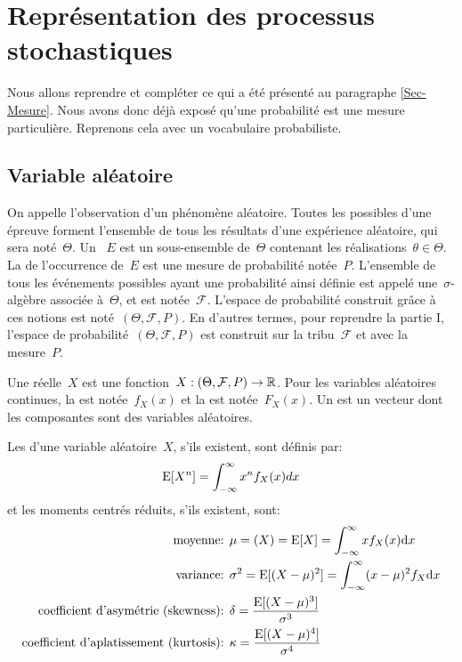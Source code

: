 \medskip
\section{Représentation des processus stochastiques}

Nous allons reprendre et compléter ce qui a été présenté au paragraphe \ref{Sec-Mesure}.
Nous avons donc déjà exposé qu'une probabilité est une mesure particulière.
Reprenons cela avec un vocabulaire probabiliste.

\medskip
\subsection{Variable aléatoire}

On appelle  l'observation d'un phénomène aléatoire.
Toutes les  possibles d'une épreuve forment l'ensemble de tous les résultats d'une expérience aléatoire, qui sera noté~$\Theta$. 
Un ~$E$ est un sous-ensemble de~$\Theta$ contenant les réalisations~$\theta\in\Theta$. 
La  de l'occurrence de~$E$ est une mesure de probabilité notée~$P$.
L'ensemble de tous les événements possibles ayant une probabilité ainsi définie est appelé une~$\sigma$-algèbre associée à~$\Theta$, et est notée~$\mathcal{F}$.
L'espace de probabilité construit grâce à ces notions est noté~$(\Theta,\mathcal{F},P)$.
En d'autres termes, pour reprendre la partie I, l'espace de probabilité~$(\Theta,\mathcal{F},P)$ est construit sur la tribu~$\mathcal{F}$ et avec la mesure~$P$.

\medskip
Une  réelle~$X$ est une fonction~$X : (\Theta,\mathcal{F},P) \rightarrow \mathbb R$. 
Pour les variables aléatoires continues, la  est notée~$f_X(x)$ et la  est notée~$F_X(x)$.
Un  est un vecteur dont les composantes sont des variables aléatoires.

\medskip
\begin{definition}
Les  d'une variable aléatoire~$X$, s'ils existent, sont définis par:
\begin{equation}
\operatorname{E}[X^n] = \displaystyle\int_{-\infty}^\infty x^nf_X(x)dx
\end{equation}
et les moments centrés réduits, s'ils existent, sont:
\begin{align}
\text{moyenne: } & \mu = \left(X\right) = \operatorname{E}[X] = \displaystyle\int_{-\infty}^\infty xf_X(x) \text{d} x  \\
\text{variance: } & \sigma^2 = \operatorname{E}[(X-\mu)^2] = \displaystyle\int_{-\infty}^\infty (x-\mu)^2f_X \text{d} x \\
\text{coefficient d'asymétrie (skewness): } & \delta = \dfrac{\operatorname{E}[(X-\mu)^3]}{\sigma^3} \\
\text{coefficient d'aplatissement (kurtosis): } & \kappa = \dfrac{\operatorname{E}[(X-\mu)^4]}{\sigma^4}
\end{align}
\end{definition}


